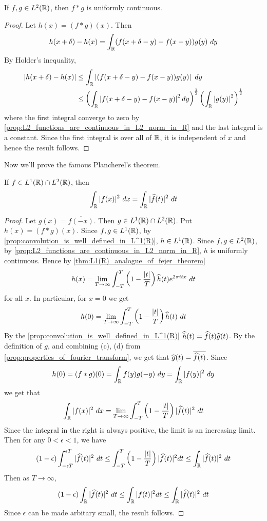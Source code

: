   \begin{proposition}
    If $f, g \in L^2(\mathbb R)$, then $f*g$ is uniformly continuous.
  \end{proposition}
  \begin{proof}
    Let $h(x) = (f*g)(x)$. Then $$h(x+\delta) - h(x) = \int_\mathbb R (f(x+\delta - y) - f(x-y)) g(y) \ dy$$
    By Holder's inequality, 
    \begin{align*}
      |h(x+\delta) - h(x)| &\le \int_\mathbb R \left|(f(x+\delta - y) - f(x-y)) g(y) \right| \ dy \\
      &\le \left( \int_\mathbb R \left|f(x+\delta - y) - f(x-y) \right|^2 dy\right)^{\frac{1}{2}} \left( \int_\mathbb R \left|g(y)\right|^2 \right)^{\frac{1}{2}}
    \end{align*}
    where the first integral converge to zero by \autoref{prop:L2_functions_are_continuous_in_L2_norm_in_R} and the last integral is a constant. Since the first integral is over all of $\mathbb R$, it is independent of $x$ and hence the result follows.
  \end{proof}

Now we'll prove the famous Plancherel's theorem.
\begin{theorem}
  \label{thm:Plancherel's_theorem}
  If $f \in L^1(\mathbb R) \cap L^2(\mathbb R)$, then $$\int_\R |f(x)|^2 \ dx = \int_\R |\hatf(t)|^2 \ dt $$
\end{theorem}
\begin{proof}
  Let $g(x) = \overline{f(-x)}$. Then $g \in L^1(\mathbb R)\cap L^2(\mathbb R)$. Put $h(x) = (f*g)(x)$. Since $f, g \in L^1(\mathbb R)$, by \autoref{prop:convolution_is_well_defined_in_L^1(R)}, $h \in L^1(\mathbb R)$. Since $f, g \in L^2(\mathbb R)$, by \autoref{prop:L2_functions_are_continuous_in_L2_norm_in_R}, $h$ is uniformly continuous. 
  Hence by \autoref{thm:L1(R)_analogue_of_fejer_theorem}  $$h(x) = \lim_{T\to \infty} \int_{-T}^T \left(1-\frac{|t|}{T}\right) \widehat{h}(t)e^{2\pi itx} \ dt $$ for all $x$. In particular, for $x=0$ we get $$h(0) = \lim_{T\to \infty} \int_{-T}^T \left(1-\frac{|t|}{T}\right) \widehat{h}(t) \ dt$$
  By the \autoref{prop:convolution_is_well_defined_in_L^1(R)} $\widehat{h}(t) = \widehat{f}(t)\widehat{g}(t)$. By the definition of $g$, and combining (c), (d) from \autoref{prop:properties_of_fourier_transform}, we get that $\widehat{g}(t) = \overline{\widehat{f}(t)}$.
  Since $$h(0) = (f*g)(0) = \int_\mathbb R f(y)g(-y) \ dy = \int_\mathbb R |f(y)|^2 \ dy$$
  we get that $$\int_\R |f(x)|^2 \ dx = \lim_{T\to \infty} \int_{-T}^T \left(1-\frac{|t|}{T}\right) |\hatf(t)|^2 \ dt$$
  Since the integral in the right is always positive, the limit is an increasing limit. Then for any $0<\epsilon<1$, we have $$(1-\epsilon) \int_{-\epsilon T}^{\epsilon T} |\hatf(t)|^2 \ dt \le \int_{-T}^{T} \left( 1-\frac{|t|}{T} \right) |\hatf(t)|^2 dt \le \int_\R |\hatf(t)|^2 \ dt$$
  Then as $T \to \infty$, $$(1-\epsilon) \int_\mathbb R |\widehat{f}(t)|^2 \ dt \le \int_{\mathbb R} |f(t)|^2 dt \le \int_\mathbb R |\widehat{f}(t)|^2 \ dt$$
  Since $\epsilon$ can be made arbitary small, the result follows.
\end{proof}
